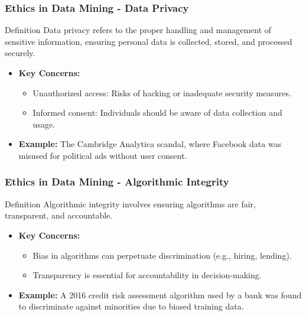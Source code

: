 \documentclass[aspectratio=169]{beamer}
\begin{document}
\begin{frame}[fragile]
    \frametitle{Ethics in Data Mining - Data Privacy}
    \begin{block}{Definition}
        Data privacy refers to the proper handling and management of sensitive information, ensuring personal data is collected, stored, and processed securely.
    \end{block}
    \begin{itemize}
        \item \textbf{Key Concerns:}
            \begin{itemize}
                \item Unauthorized access: Risks of hacking or inadequate security measures.
                \item Informed consent: Individuals should be aware of data collection and usage.
            \end{itemize}
        \item \textbf{Example:} The Cambridge Analytica scandal, where Facebook data was misused for political ads without user consent.
    \end{itemize}
\end{frame}

\begin{frame}[fragile]
    \frametitle{Ethics in Data Mining - Algorithmic Integrity}
    \begin{block}{Definition}
        Algorithmic integrity involves ensuring algorithms are fair, transparent, and accountable.
    \end{block}
    \begin{itemize}
        \item \textbf{Key Concerns:}
            \begin{itemize}
                \item Bias in algorithms can perpetuate discrimination (e.g., hiring, lending).
                \item Transparency is essential for accountability in decision-making.
            \end{itemize}
        \item \textbf{Example:} A 2016 credit risk assessment algorithm used by a bank was found to discriminate against minorities due to biased training data.
    \end{itemize}
\end{frame}
\end{document}
